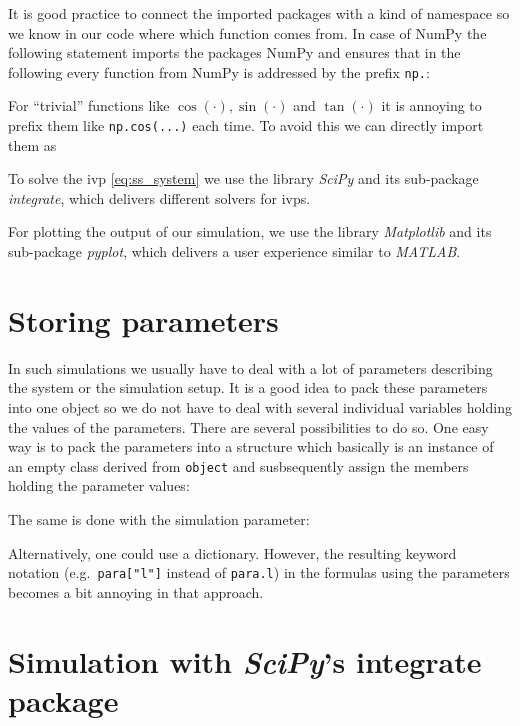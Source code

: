 \documentclass[a4paper,11pt,headings=standardclasses,parskip=half]{scrartcl}
\newcommand{\listcode}[3]{}
\newcommand{\listcodeplot}[2]{\listcode{#1}{#2}{../sim/01_car_example_plotting.py}}
\newcommand{\scipy}{\emph{SciPy}\xspace}
\newcommand{\mpl}{\emph{Matplotlib}\xspace}
\begin{document}
It is good practice to connect the imported packages with a kind of namespace so we know in our code where which function comes from. In case of NumPy the following statement imports the packages NumPy and ensures that in the following every function from NumPy is addressed by the prefix \texttt{np.}:
\listcodeplot{2}{2}
For ``trivial'' functions like $\cos(\cdot), \sin(\cdot)$ and $\tan(\cdot)$ it is annoying to prefix them like \texttt{np.cos(...)} each time. To avoid this we can directly import them as 
\listcodeplot{3}{3}
To solve the \gls{ivp} \eqref{eq:ss_system} we use the library \scipy and its sub-package \emph{integrate}, which delivers different solvers for \glspl{ivp}.
\listcodeplot{4}{4}
For plotting the output of our simulation, we use the library \mpl and its sub-package \emph{pyplot}, which delivers a user experience similar to \emph{MATLAB}.
\listcodeplot{5}{5}


\section{Storing parameters}
In such simulations we usually have to deal with a lot of parameters describing the system or the simulation setup. It is a good idea to pack these parameters into one object so we do not have to deal with several individual variables holding the values of the parameters. There are several possibilities to do so. One easy way is to pack the parameters into a structure which basically is an instance of an empty class derived from \texttt{object} and susbsequently assign the members holding the parameter values:
\listcodeplot{8}{15}
The same is done with the simulation parameter:
\listcodeplot{17}{21}

Alternatively, one could use a dictionary. However, the resulting keyword notation (e.g.~\texttt{para["l"]} instead of \texttt{para.l}) in the formulas using the parameters becomes a bit annoying in that approach.


\section{Simulation with \scipy's integrate package} \label{sec:simulation}
\end{document}
